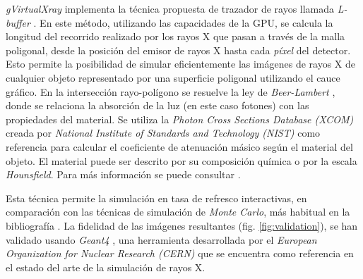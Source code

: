 \emph{gVirtualXray} implementa la técnica propuesta de trazador de rayos llamada \emph{L-buffer} \cite{Freud2006175}. En este método, utilizando las capacidades de la \ac{GPU}, se calcula la longitud del recorrido realizado por los rayos X que pasan a través de la malla poligonal, desde la posición del emisor de rayos X hasta cada \emph{píxel} del detector. Esto permite la posibilidad de simular eficientemente las imágenes de rayos X de cualquier objeto representado por una superficie poligonal utilizando el cauce gráfico. En la intersección rayo-polígono se resuelve la ley de \emph{Beer-Lambert} \cite{sujar:hal}, donde se relaciona la absorción de la luz (en este caso fotones) con las propiedades del material. Se utiliza la \emph{Photon Cross Sections Database (XCOM)} creada por \emph{National Institute of Standards and Technology (NIST)} \cite{XCOM} como referencia para calcular el coeficiente de atenuación másico según el material del objeto. El material puede ser descrito por su composición química o por la escala \emph{Hounsfield}.  %
Para más información se puede consultar \cite{vidal2009simulation}.

Esta técnica permite la simulación en tasa de refresco interactivas, en comparación con las técnicas de  simulación de \emph{Monte Carlo}, más habitual en la bibliografía \cite{PENELOPE,badal2009}. La fidelidad de las imágenes resultantes (fig. \ref{fig:validation}), se han validado usando \emph{Geant4} \cite{Agostinelli2003250}, una herramienta desarrollada por el \emph{European Organization for Nuclear Research (CERN)} que se encuentra como referencia en el estado del arte de la simulación de rayos X.

